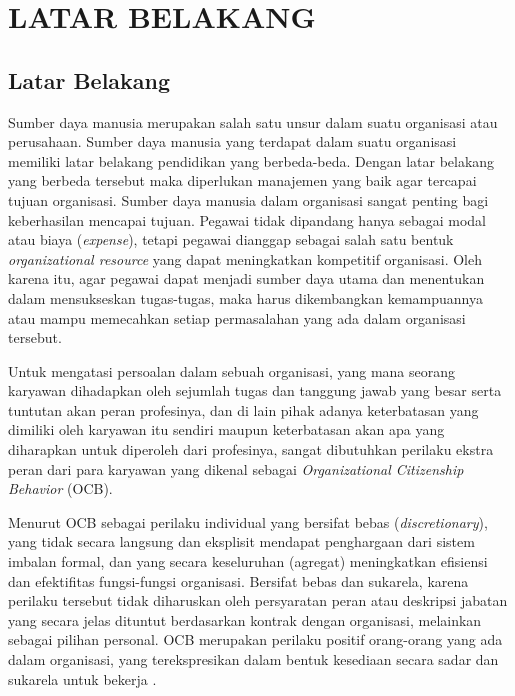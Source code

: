 
\chapter{LATAR BELAKANG}

\section{Latar Belakang }

Sumber daya manusia merupakan salah satu unsur dalam suatu organisasi atau perusahaan. Sumber daya manusia yang terdapat dalam suatu organisasi memiliki latar belakang pendidikan yang berbeda-beda. Dengan latar belakang yang berbeda tersebut maka diperlukan manajemen yang baik agar tercapai tujuan organisasi. Sumber daya manusia dalam organisasi sangat penting bagi keberhasilan mencapai tujuan. Pegawai tidak dipandang hanya sebagai modal atau biaya (\textit{expense}), tetapi pegawai dianggap sebagai salah satu bentuk \textit{organizational resource} yang dapat meningkatkan kompetitif organisasi. Oleh karena itu, agar pegawai dapat menjadi sumber daya utama dan menentukan dalam mensukseskan tugas-tugas, maka harus dikembangkan kemampuannya atau mampu memecahkan setiap permasalahan yang ada dalam organisasi tersebut.

Untuk mengatasi persoalan dalam sebuah organisasi, yang mana seorang karyawan dihadapkan oleh sejumlah tugas dan tanggung jawab yang besar serta tuntutan akan peran profesinya, dan di lain pihak adanya keterbatasan yang dimiliki oleh karyawan itu sendiri maupun keterbatasan akan apa yang diharapkan untuk diperoleh dari profesinya, sangat dibutuhkan perilaku ekstra peran dari para karyawan yang dikenal sebagai \textit{ Organizational Citizenship Behavior} (OCB).

Menurut \textcite{organ2006} OCB sebagai perilaku individual yang bersifat bebas (\textit{discretionary}), yang tidak secara langsung dan eksplisit mendapat penghargaan dari sistem imbalan formal, dan yang secara keseluruhan (agregat) meningkatkan efisiensi dan efektifitas fungsi-fungsi organisasi. Bersifat bebas dan sukarela, karena perilaku tersebut tidak diharuskan oleh persyaratan peran atau deskripsi jabatan yang secara jelas dituntut berdasarkan kontrak dengan organisasi, melainkan sebagai pilihan personal. OCB merupakan perilaku positif orang-orang yang ada dalam organisasi, yang terekspresikan dalam bentuk kesediaan secara sadar dan sukarela untuk bekerja \parencite{Erratt2013}.

